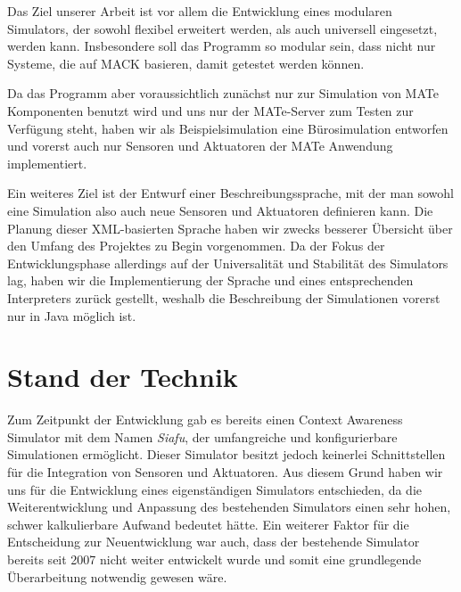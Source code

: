 Das Ziel unserer Arbeit ist vor allem die Entwicklung eines modularen Simulators, der sowohl flexibel erweitert werden, als auch universell eingesetzt, werden kann. Insbesondere soll das Programm so modular sein, dass nicht nur Systeme, die auf MACK basieren, damit getestet werden können.

Da das Programm aber voraussichtlich zunächst nur zur Simulation von MATe Komponenten benutzt wird und uns nur der MATe-Server zum Testen zur Verfügung steht, haben wir als Beispielsimulation eine Bürosimulation entworfen und vorerst auch nur Sensoren und Aktuatoren der MATe Anwendung implementiert.

Ein weiteres Ziel ist der Entwurf einer Beschreibungssprache, mit der man sowohl eine Simulation also auch neue Sensoren und Aktuatoren definieren kann. Die Planung dieser XML-basierten Sprache haben wir zwecks besserer Übersicht über den Umfang des Projektes zu Begin vorgenommen. Da der Fokus der Entwicklungsphase allerdings auf der Universalität und Stabilität des Simulators lag, haben wir die Implementierung der Sprache und eines entsprechenden Interpreters zurück gestellt, weshalb die Beschreibung der Simulationen vorerst nur in Java möglich ist.

\section{Stand der Technik}\label{sec:state_of_art}


Zum Zeitpunkt der Entwicklung gab es bereits einen Context Awareness Simulator mit dem Namen \emph{Siafu}, der umfangreiche und konfigurierbare Simulationen ermöglicht. Dieser Simulator besitzt jedoch keinerlei Schnittstellen für die Integration von Sensoren und Aktuatoren. Aus diesem Grund haben wir uns für die Entwicklung eines eigenständigen Simulators entschieden, da die Weiterentwicklung und Anpassung des bestehenden Simulators einen sehr hohen, schwer kalkulierbare Aufwand bedeutet hätte. Ein weiterer Faktor für die Entscheidung zur Neuentwicklung war auch, dass der bestehende Simulator bereits seit 2007 nicht weiter entwickelt wurde und somit eine grundlegende Überarbeitung notwendig gewesen wäre.

